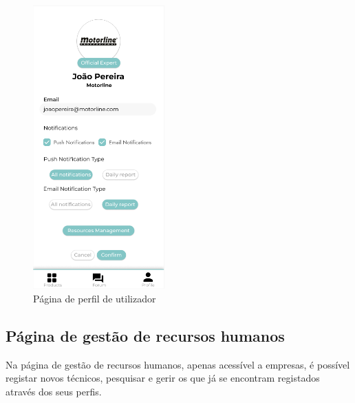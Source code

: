 \begin{figure}[htb]
  \centering
  \includegraphics[width=0.45\textwidth]{images/mockups/user_profile.png}
  \caption{Página de perfil de utilizador}
  \label{fig:30}
\end{figure}

\newpage

\subsection{Página de gestão de recursos humanos}

Na página de gestão de recursos humanos, apenas acessível a empresas, é possível registar novos técnicos, pesquisar e gerir os que já se encontram registados através dos seus perfis.

